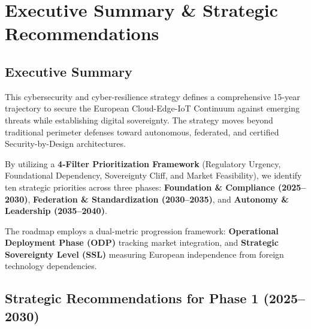 \documentclass[12pt,a4paper]{article}
\begin{document}
\newpage
\section{Executive Summary \& Strategic Recommendations}

\subsection*{Executive Summary}
This cybersecurity and cyber-resilience strategy defines a comprehensive 15-year trajectory to secure the European Cloud-Edge-IoT Continuum against emerging threats while establishing digital sovereignty. The strategy moves beyond traditional perimeter defenses toward autonomous, federated, and certified Security-by-Design architectures.

By utilizing a \textbf{4-Filter Prioritization Framework} (Regulatory Urgency, Foundational Dependency, Sovereignty Cliff, and Market Feasibility), we identify ten strategic priorities across three phases: \textbf{Foundation \& Compliance (2025--2030)}, \textbf{Federation \& Standardization (2030--2035)}, and \textbf{Autonomy \& Leadership (2035--2040)}.

The roadmap employs a dual-metric progression framework: \textbf{Operational Deployment Phase (ODP)} tracking market integration, and \textbf{Strategic Sovereignty Level (SSL)} measuring European independence from foreign technology dependencies.

\subsection*{Strategic Recommendations for Phase 1 (2025--2030)}
\end{document}
